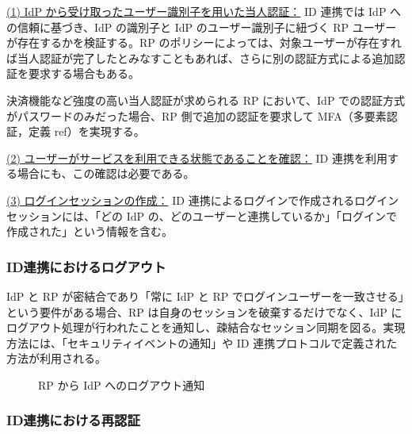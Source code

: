 \documentclass[uplatex]{jsarticle}
\def\ref#1{ref}%
\def\label#1{}%
\begin{document}
\underline{(1) IdP から受け取ったユーザー識別子を用いた当人認証：}
ID 連携では IdP への信頼に基づき、IdP の識別子と IdP のユーザー識別子に紐づく RP ユーザーが存在するかを検証する。RP のポリシーによっては、対象ユーザーが存在すれば当人認証が完了したとみなすこともあれば、さらに別の認証方式による追加認証を要求する場合もある。

\begin{exa}\label{exa:ch4-rp-additional-auth}
決済機能など強度の高い当人認証が求められる RP において、IdP での認証方式がパスワードのみだった場合、RP 側で追加の認証を要求して MFA（多要素認証，定義 \ref{dfn:mfa}）を実現する。
\end{exa}

\underline{(2) ユーザーがサービスを利用できる状態であることを確認：}
ID 連携を利用する場合にも、この確認は必要である。

\underline{(3) ログインセッションの作成：}
ID 連携によるログインで作成されるログインセッションには、「どの IdP の、どのユーザーと連携しているか」「ログインで作成された」という情報を含む。

\subsubsection{ID連携におけるログアウト}

IdP と RP が密結合であり「常に IdP と RP でログインユーザーを一致させる」という要件がある場合、RP は自身のセッションを破棄するだけでなく、IdP にログアウト処理が行われたことを通知し、疎結合なセッション同期を図る。実現方法には、「セキュリティイベントの通知」や ID 連携プロトコルで定義された方法が利用される。

\begin{figure}[H]
\centering
{}
\caption{RP から IdP へのログアウト通知}
\label{fig:ch4-rp-logout-notification}
\end{figure}

\subsubsection{ID連携における再認証}
\end{document}
